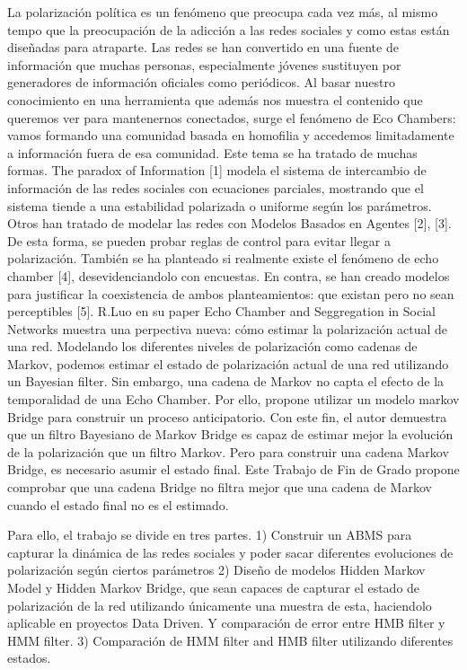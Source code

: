 \documentclass[12pt]{report} %
\begin{document}
La polarización política es un fenómeno que preocupa cada vez más, al mismo tempo que la preocupación de la adicción a las redes sociales y como estas están diseñadas para atraparte. Las redes se han convertido en una fuente de información que muchas personas, especialmente jóvenes sustituyen por generadores de información oficiales como periódicos. Al basar nuestro conocimiento en una herramienta que además nos muestra el contenido que queremos ver para mantenernos conectados, surge el fenómeno de Eco Chambers: vamos formando una comunidad basada en homofilia  y accedemos limitadamente a información fuera de esa comunidad.
Este tema se ha tratado de muchas formas. The paradox of Information  [1] modela el sistema de intercambio de información de las redes sociales con ecuaciones parciales, mostrando que el sistema tiende a una estabilidad polarizada o uniforme según los parámetros. Otros han tratado de modelar las redes con Modelos Basados en Agentes [2], [3]. De esta forma, se pueden probar reglas de control para evitar llegar a polarización. También se ha planteado si realmente existe el fenómeno de echo chamber [4], desevidenciandolo con encuestas. En contra, se han creado modelos para justificar la coexistencia de ambos planteamientos: que existan pero no sean perceptibles [5].
R.Luo en su paper Echo Chamber and Seggregation in Social Networks muestra una perpectiva nueva: cómo estimar la polarización actual de una red. Modelando los diferentes niveles de polarización como cadenas de Markov, podemos estimar el estado de polarización actual de una red utilizando un Bayesian filter. Sin embargo, una cadena de Markov no capta el efecto de la temporalidad de una Echo Chamber. Por ello, propone utilizar un modelo markov Bridge para construir un proceso anticipatorio. 
Con este fin, el autor demuestra que un filtro Bayesiano de Markov Bridge es capaz de estimar mejor la evolución de la polarización que un filtro Markov. Pero para construir una cadena Markov Bridge, es necesario asumir el estado final.  Este Trabajo de Fin de Grado propone comprobar que una cadena Bridge no filtra mejor que una cadena de Markov cuando el estado final no es el estimado.

Para ello, el trabajo se divide en tres partes.
1) Construir un ABMS para capturar la dinámica de las redes sociales y poder sacar diferentes evoluciones de polarización según ciertos parámetros
2)  Diseño de modelos Hidden Markov Model y Hidden Markov Bridge, que sean capaces de capturar el estado de polarización de la red utilizando únicamente una muestra de esta, haciendolo aplicable en proyectos Data Driven. Y comparación de error entre HMB filter y HMM filter.
3) Comparación de HMM filter and HMB filter utilizando diferentes estados.
\end{document}
